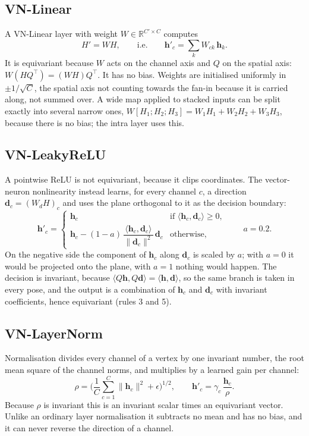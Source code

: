 \documentclass[11pt,a4paper]{article}
\theoremstyle{remark}
\newcommand{\R}{\mathbb{R}}
\newcommand{\T}{^{\top}}
\newcommand{\ip}[2]{\langle #1,#2\rangle}
\newcommand{\norm}[1]{\lVert #1\rVert}
\begin{document}
\subsection{VN-Linear}
A VN-Linear layer with weight $W\in\R^{C'\times C}$ computes
\begin{equation}
  H'=WH,\qquad\text{i.e.}\qquad \mathbf h'_c=\sum_kW_{ck}\,\mathbf h_k .
\end{equation}
It is equivariant because $W$ acts on the channel axis and $Q$ on the spatial axis: $W(HQ\T)=(WH)Q\T$. It has no bias. Weights are initialised uniformly in $\pm1/\sqrt{C}$, the spatial axis not counting towards the fan-in because it is carried along, not summed over. A wide map applied to stacked inputs can be split exactly into several narrow ones, $W[H_1;H_2;H_3]=W_1H_1+W_2H_2+W_3H_3$, because there is no bias; the intra layer uses this.

\subsection{VN-LeakyReLU}
A pointwise ReLU is not equivariant, because it clips coordinates. The vector-neuron nonlinearity instead learns, for every channel $c$, a direction $\mathbf d_c=(W_dH)_c$ and uses the plane orthogonal to it as the decision boundary:
\begin{equation}
  \mathbf h'_c=\begin{cases}
    \mathbf h_c & \text{if }\ip{\mathbf h_c}{\mathbf d_c}\ge0,\\[2pt]
    \mathbf h_c-(1-a)\,\dfrac{\ip{\mathbf h_c}{\mathbf d_c}}{\norm{\mathbf d_c}^2}\,\mathbf d_c & \text{otherwise,}
  \end{cases}
  \qquad a=0.2 .
\end{equation}
On the negative side the component of $\mathbf h_c$ along $\mathbf d_c$ is scaled by $a$; with $a=0$ it would be projected onto the plane, with $a=1$ nothing would happen. The decision is invariant, because $\ip{Q\mathbf h}{Q\mathbf d}=\ip{\mathbf h}{\mathbf d}$, so the same branch is taken in every pose, and the output is a combination of $\mathbf h_c$ and $\mathbf d_c$ with invariant coefficients, hence equivariant (rules 3 and 5).

\subsection{VN-LayerNorm}
Normalisation divides every channel of a vertex by one invariant number, the root mean square of the channel norms, and multiplies by a learned gain per channel:
\begin{equation}
  \rho=\Big(\frac1C\sum_{c=1}^C\norm{\mathbf h_c}^2+\epsilon\Big)^{1/2},\qquad
  \mathbf h'_c=\gamma_c\,\frac{\mathbf h_c}{\rho}.
\end{equation}
Because $\rho$ is invariant this is an invariant scalar times an equivariant vector. Unlike an ordinary layer normalisation it subtracts no mean and has no bias, and it can never reverse the direction of a channel.
\end{document}

